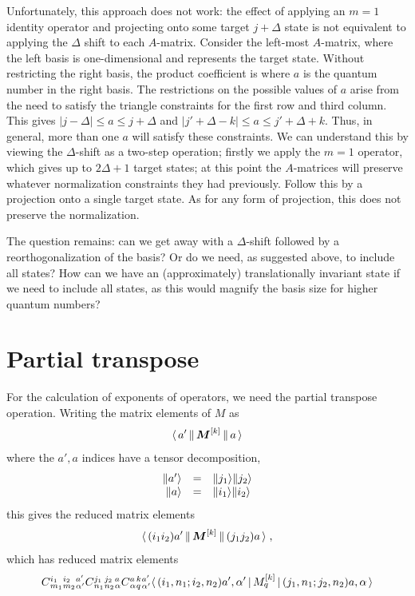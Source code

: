 \documentclass{article}[10pt]
\begin{document}
Unfortunately, this approach does not work: the effect of applying an $m=1$ identity operator
and projecting onto some target $j+\Delta$ state is not equivalent to applying the $\Delta$ shift
to each $A$-matrix. Consider the left-most $A$-matrix, where the left basis is one-dimensional
and represents the target state. Without restricting the right basis, the product coefficient is
\beq
{}
\eeq
where $a$ is the quantum number in the right basis. The restrictions on the possible values
of $a$ arise from the need to satisfy the triangle constraints for the first row and third column.
This gives $|j-\Delta| \leq a \leq j+\Delta$ and $|j'+\Delta-k| \leq a \leq j'+\Delta+k$.
Thus, in general, more than one $a$ will satisfy these constraints. We can understand this by
viewing the $\Delta$-shift as a two-step operation; firstly we apply the $m=1$ operator, which gives
up to $2\Delta+1$ target states; at this point the $A$-matrices will preserve whatever normalization
constraints they had previously. Follow this by a projection onto a single target state. As for any
form of projection, this does not preserve the normalization.

The question remains: can we get away with a $\Delta$-shift followed by a reorthogonalization of
the basis? Or do we need, as suggested above, to include all states? How can we have an (approximately)
translationally invariant state if we need to include all states, as this would magnify the basis
size for higher quantum numbers?



\section{Partial transpose}


For the calculation of exponents of operators, we need the partial transpose operation. Writing
the matrix elements of $M$ as
\begin{equation}
\rbigbraket{a'}{\itensor{M}{k}}{a}
\end{equation}
where the $a',a$ indices have a tensor decomposition,
\begin{equation}
\begin{array}{rcl}
\rket{a'} &=& \rket{j_1} \rket{j_2} \\
\rket{a} &=& \rket{i_1} \rket{i_2}
\end{array}
\end{equation}
this gives the reduced matrix elements
\begin{equation}
\rbigbraket{(i_1 i_2) a'}{\itensor{M}{k}}{(j_1 j_2) a} \; ,
\end{equation}
which has reduced matrix elements
\begin{equation}
\qcg{i_1}{i_2}{a'}{m_1}{m_2}{\alpha'}
\qcg{j_1}{j_2}{a}{n_1}{n_2}{\alpha}
\qcg{a}{k}{a'}{\alpha}{q}{\alpha'}
\bigbraket{(i_1, n_1 ; i_2, n_2) a',\alpha'}{\itensorcomp{M}{k}{q}}{(j_1,n_1;j_2,n_2) a,\alpha}
\end{equation}
\end{document}

